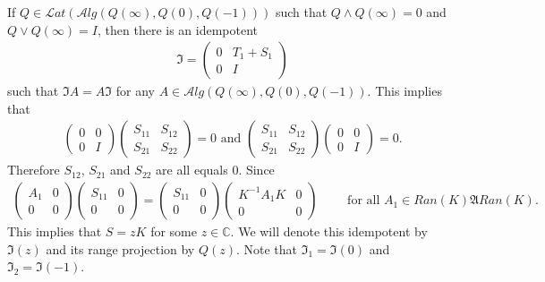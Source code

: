 \documentclass[a4paper,10pt]{amsart}
\newcommand{\AAA}{\mathfrak A}
\newcommand{\II}{\mathfrak I}
\newcommand{\Lat}{\mathcal Lat}
\newcommand{\Alg}{\mathcal Alg}
\newcommand{\C}{\mathbb C} %
\begin{document}
If $Q \in \Lat(\Alg(Q(\infty), Q(0), Q(-1)))$ such that
$Q \wedge Q(\infty) = 0$ and $Q \vee Q(\infty) = I$, then there is
an idempotent
\begin{align*}
   \II = \begin{pmatrix}
       0 & T_{1} + S_{1} \\
       0 & I 
   \end{pmatrix} 
\end{align*}
such that $\II A = A\II$ for any $A \in \Alg(Q(\infty), Q(0), Q(-1))$. 
This implies that
\begin{align*}
   \begin{pmatrix}
      0 & 0\\
      0 & I
   \end{pmatrix}
   \begin{pmatrix}
       S_{11} & S_{12}\\
       S_{21} & S_{22}
   \end{pmatrix} = 0 \mbox{ and }
   \begin{pmatrix}
       S_{11} & S_{12}\\
       S_{21} & S_{22}
   \end{pmatrix}
    \begin{pmatrix}
      0 & 0\\
      0 & I
   \end{pmatrix} = 0.
\end{align*}
Therefore $S_{12}$, $S_{21}$ and $S_{22}$ are all equals $0$.
Since
\begin{align*}
   \begin{pmatrix}
       A_{1} & 0 \\
       0 & 0
   \end{pmatrix} 
   \begin{pmatrix}
       S_{11} & 0 \\
       0 & 0
   \end{pmatrix}
   = 
   \begin{pmatrix}
       S_{11} & 0 \\
       0 & 0
   \end{pmatrix}
   \begin{pmatrix}
       K^{-1}A_{1}K & 0 \\
       0 & 0
   \end{pmatrix} \qquad \mbox{ for all $A_{1} \in Ran(K)\AAA Ran(K)$}. 
\end{align*}
This implies that $S = z K$ for some $z \in \C$. We will denote 
this idempotent by $\II(z)$ and its range projection by $Q(z)$. 
Note that $\II_1 = \II(0)$ and $\II_{2} = \II(-1)$.
\end{document}
